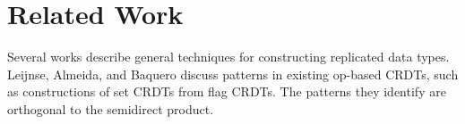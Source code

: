 \documentclass[acmsmall,nonacm,12pt]{acmart}
\newcommand{\mc}[1]{\ensuremath{\mathcal{#1}}}
\newcommand{\msf}[1]{\ensuremath{\mathsf{#1}}}
\theoremstyle{plain}
\theoremstyle{definition}
\begin{document}
%
%
%
%
%
%
%
%






\section{Related Work}
Several works describe general techniques for constructing replicated data types.  Leijnse, Almeida, and Baquero \cite{op_based_patterns} discuss patterns in existing op-based CRDTs, such as constructions of set CRDTs from flag CRDTs.  The patterns they identify are orthogonal to the semidirect product.
\end{document}
